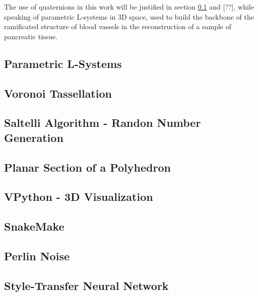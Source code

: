 The use of quaternions in this work will be justified in section \ref{ssec:Lsys} and [??], while speaking of parametric L-systems in 3D space, used to build the backbone of the ramificated structure of blood vassels in the reconstruction of a sample of pancreatic tissue.

\subsection{Parametric L-Systems} \label{ssec:Lsys}

\subsection{Voronoi Tassellation}

\subsection{Saltelli Algorithm - Randon Number Generation}

\subsection{Planar Section of a Polyhedron}

\subsection{VPython - 3D Visualization}

\subsection{SnakeMake}

\subsection{Perlin Noise}

\subsection{Style-Transfer Neural Network}\label{ssec:sttrNN}
